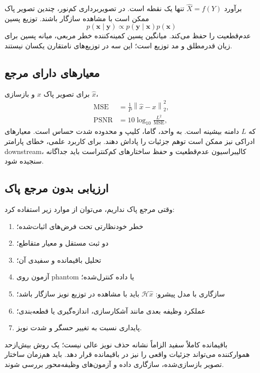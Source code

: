 \documentclass[12pt,openany,oneside]{book}
\newcommand{\norm}[1]{\left\lVert #1\right\rVert}
\newcommand{\vect}[1]{\bm{#1}}
\newcommand{\MSE}{\operatorname{MSE}}
\newcommand{\PSNR}{\operatorname{PSNR}}
\begin{document}
برآورد \(\widehat X=f(Y)\) تنها یک نقطه است. در تصویربرداری کم‌نور، چندین تصویر پاک ممکن است با مشاهده سازگار باشند.
توزیع پسین
\begin{equation}
p(\vect{x}\mid\vect{y})
\propto p(\vect{y}\mid\vect{x})p(\vect{x})
\end{equation}
عدم‌قطعیت را حفظ می‌کند. میانگین پسین کمینه‌کننده خطر مربعی، میانه پسین برای زیان قدرمطلق و  مد توزیع است؛
این سه در توزیع‌های نامتقارن یکسان نیستند.

\subsection{معیارهای دارای مرجع}

برای تصویر پاک \(x\) و بازسازی \(\widehat x\)،
\begin{align}
\MSE&=\frac1P\norm{\widehat x-x}_2^2,\\
\PSNR&=10\log_{10}\frac{L^2}{\MSE},
\end{align}
که \(L\) دامنه بیشینه است.  به واحد، گاما، کلیپ و محدوده شدت حساس است. معیارهای ادراکی نیز ممکن است
توهم جزئیات را پاداش دهند. برای کاربرد علمی، خطای پارامتر downstream، کالیبراسیون عدم‌قطعیت و حفظ ساختارهای کم‌کنتراست
باید جداگانه سنجیده شود.

\subsection{ارزیابی بدون مرجع پاک}

وقتی مرجع پاک نداریم، می‌توان از موارد زیر استفاده کرد:
\begin{enumerate}
\item خطر خودنظارتی تحت فرض‌های اثبات‌شده؛
\item دو ثبت مستقل و معیار متقاطع؛
\item تحلیل باقیمانده و سفیدی آن؛
\item آزمون روی phantom یا داده کنترل‌شده؛
\item سازگاری با مدل پیشرو: \(\mathcal H\widehat x\) باید با مشاهده در توزیع نویز سازگار باشد؛
\item عملکرد وظیفه بعدی مانند آشکارسازی، اندازه‌گیری یا قطعه‌بندی؛
\item پایداری نسبت به تغییر حسگر و شدت نویز.
\end{enumerate}

\begin{warningbox}
باقیمانده کاملاً سفید الزاماً نشانه حذف نویز عالی نیست؛ یک روش بیش‌ازحد هموارکننده می‌تواند جزئیات واقعی را نیز در
باقیمانده قرار دهد. باید هم‌زمان ساختار تصویر بازسازی‌شده، سازگاری داده و آزمون‌های وظیفه‌محور بررسی شوند.
\end{warningbox}
\end{document}
